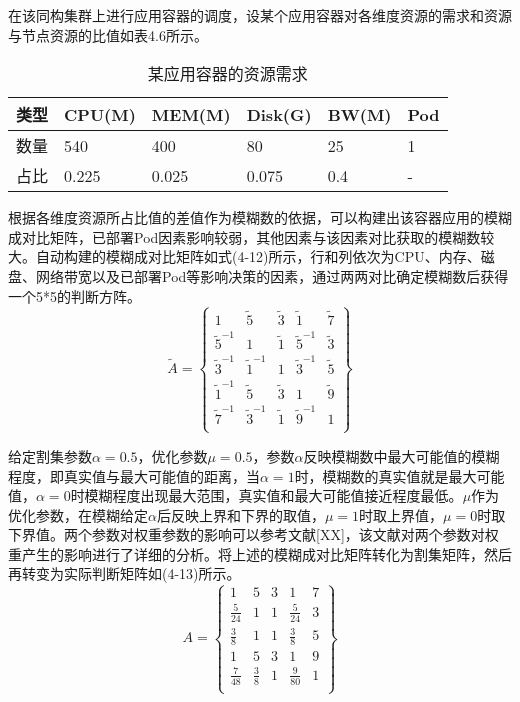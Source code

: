 在该同构集群上进行应用容器的调度，设某个应用容器对各维度资源的需求和资源与节点资源的比值如表4.6所示。
\begin{table}[htbp]
	\centering\dawu[1.3]
	\caption{某应用容器的资源需求}
	\begin{tabular}{|p{1.8cm}<{\centering}|p{1.8cm}<{\centering}|p{1.8cm}<{\centering}|p{1.8cm}<{\centering}|p{1.8cm}<{\centering}|p{1.8cm}<{\centering}|} \hline
		类型 & CPU(M) & MEM(M) & Disk(G) & BW(M) & Pod \\ \hline
		数量 & 540 & 400 & 80 & 25 & 1 \\ \hline
		占比 & 0.225 & 0.025 & 0.075 & 0.4 & - \\ \hline
	\end{tabular}
\end{table}

根据各维度资源所占比值的差值作为模糊数的依据，可以构建出该容器应用的模糊成对比矩阵，已部署Pod因素影响较弱，其他因素与该因素对比获取的模糊数较大。自动构建的模糊成对比矩阵如式(4-12)所示，行和列依次为CPU、内存、磁盘、网络带宽以及已部署Pod等影响决策的因素，通过两两对比确定模糊数后获得一个5*5的判断方阵。
\begin{equation}
\widetilde{A} = \left\{\begin{array}{ccccc}
1 & \widetilde{5} & \widetilde{3} & \widetilde{1} & \widetilde{7}  \\
\widetilde{5}^{-1} & 1 & \widetilde{1} & \widetilde{5}^{-1} & \widetilde{3} \\
\widetilde{3}^{-1} & \widetilde{1}^{-1} & 1 & \widetilde{3}^{-1} & \widetilde{5} \\
\widetilde{1}^{-1} & \widetilde{5} & \widetilde{3} & 1 & \widetilde{9} \\
\widetilde{7}^{-1} & \widetilde{3}^{-1} & \widetilde{1} & \widetilde{9}^{-1} & 1 \\
\end{array}\right\}
\end{equation}

给定割集参数$\alpha=0.5$，优化参数$\mu=0.5$，参数$\alpha$反映模糊数中最大可能值的模糊程度，即真实值与最大可能值的距离，当$\alpha=1$时，模糊数的真实值就是最大可能值，$\alpha=0$时模糊程度出现最大范围，真实值和最大可能值接近程度最低。$\mu$作为优化参数，在模糊给定$\alpha$后反映上界和下界的取值，$\mu=1$时取上界值，$\mu=0$时取下界值。两个参数对权重参数的影响可以参考文献[XX]，该文献对两个参数对权重产生的影响进行了详细的分析。将上述的模糊成对比矩阵转化为割集矩阵，然后再转变为实际判断矩阵如(4-13)所示。
\begin{equation}
A = \left\{\begin{array}{ccccc}
1 & 5 & 3 & 1 & 7 \\
\frac{5}{24} & 1 & 1 & \frac{5}{24} & 3 \\
\frac{3}{8} & 1 & 1 & \frac{3}{8} & 5 \\
1 & 5 & 3 & 1 & 9 \\
\frac{7}{48} & \frac{3}{8} & 1 & \frac{9}{80} & 1 \\
\end{array}\right\}
\end{equation}












